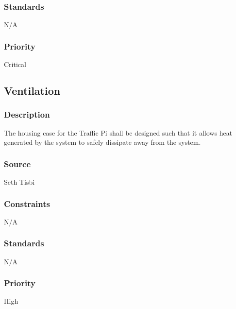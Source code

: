 \subsubsection{Standards}
N/A
\subsubsection{Priority}
Critical

\subsection{Ventilation}
\subsubsection{Description}
The housing case for the Traffic Pi shall be designed such that it allows heat generated by the system to safely dissipate away from the system.
\subsubsection{Source}
Seth Tisbi
\subsubsection{Constraints}
N/A
\subsubsection{Standards}
N/A
\subsubsection{Priority}
High